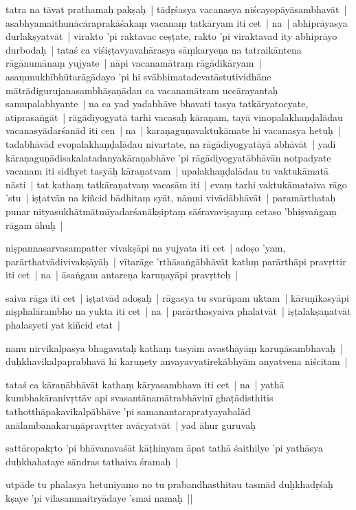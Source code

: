 \documentclass[article,12pt,a4paper]{memoir}
\begin{document}
	  \pstart tatra na tāvat prathamaḥ pakṣaḥ | tādṛśasya vacanasya niścayopāyāsambhavāt | asabhyamaithunācāraprakāśakaṃ vacanaṃ tatkāryam iti cet | na | abhiprāyasya durlakṣyatvāt | virakto 'pi raktavac ceṣṭate, rakto 'pi viraktavad ity abhiprāyo durbodaḥ | tataś ca viśiṣṭavyavahārasya sāṃkaryeṇa na tatraikāntena rāgānumānaṃ yujyate | nāpi vacanamātraṃ rāgādikāryam | asaṃmukhībhūtarāgādayo 'pi hi svābhimatadevatāstutividhāne mātrādigurujanasambhāṣaṇādau ca vacanamātram uccārayantaḥ samupalabhyante | na ca yad yadabhāve bhavati tasya tatkāryatocyate, atiprasaṅgāt | rāgādiyogyatā tarhi vacasaḥ kāraṇam, tayā vinopalakhaṇḍalādau vacanasyādarśanād iti cen | na | karaṇaguṇavaktukāmate hi vacanasya hetuḥ | tadabhāvād evopalakhaṇḍalādau nivartate, na rāgādiyogyatāyā abhāvāt | yadi kāraṇaguṇādisakalatadanyakāraṇabhāve 'pi rāgādiyogyatābhāvān notpadyate vacanam iti sidhyet tasyāḥ kāraṇatvam | upalakhaṇḍalādau tu vaktukāmatā nāsti | tat kathaṃ tatkāraṇatvaṃ vacasām iti | evaṃ tarhi vaktukāmataiva rāgo 'stu | iṣṭatvān na kiñcid bādhitaṃ syāt, nāmni vivādābhāvāt | paramārthataḥ punar nityasukhātmātmīyadarśanākṣiptaṃ sāśravaviṣayaṃ cetaso 'bhiṣvaṅgaṃ rāgam āhuḥ | 
	\pend
      

	  \pstart niṣpannasarvasampatter vivakṣāpi na yujyata iti cet | adoṣo 'yam, parārthatvādivivakṣāyāḥ | vītarāge 'rthāsaṅgābhāvāt kathṃ parārthāpi pravṛttir iti cet | na | āsaṅgam antareṇa karuṇayāpi pravṛtteḥ | 
	\pend
      

	  \pstart saiva rāga iti cet | iṣṭatvād adoṣaḥ | rāgasya tu svarūpam uktam | kāruṇikasyāpi niṣphalārambho na yukta iti cet | na | parārthasyaiva phalatvāt | iṣṭalakṣaṇatvāt phalasyeti yat kiñcid etat | 
	\pend
      

	  \pstart nanu nirvikalpasya bhagavataḥ kathaṃ tasyām avasthāyāṃ karuṇāsambhavaḥ | duḥkhavikalpaprabhavā hi karuṇety anvayavyatirekābhyām anyatvena niścitam | 
	\pend
      

	  \pstart tataś ca kāraṇābhāvāt kathaṃ kāryasambhava iti cet | na | yathā kumbhakāranivṛttāv api svasantānamātrabhāvinī ghaṭādisthitis tathotthāpakavikalpābhāve 'pi samanantarapratyayabalād anālambanakaruṇāpravṛtter avāryatvāt | yad āhur guruvaḥ 
	\pend
      

	  \pstart sattāropakṛto 'pi bhāvanavaśāt kāṭhinyam āpat tathā śaithilye 'pi yathāsya duḥkhahataye sāndras tathaiva śramaḥ | 
	\pend
      

	  \pstart utpāde tu phalasya hetuniyamo no tu prabandhasthitau tasmād duḥkhadṛśaḥ kṣaye 'pi vilasanmaitryādaye 'smai namaḥ || 
	\pend
      
\end{document}
